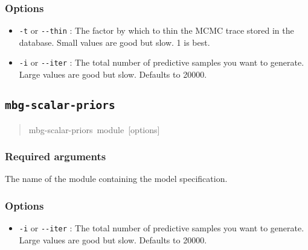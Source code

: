 


\subsubsection{Options}
\label{sec:id9}
\begin{itemize}
\item {} 
\texttt{-t} or \texttt{-{}-thin} : The factor by which to thin the MCMC trace stored in the database.
Small values are good but slow. 1 is best.

\item {} 
\texttt{-i} or \texttt{-{}-iter} : The total number of predictive samples you want to generate. Large
values are good but slow. Defaults to 20000.

\end{itemize}





\subsection{\texttt{mbg-scalar-priors}}
\label{sec:mbg-scalar-priors}
\begin{quote}{\ttfamily \raggedright \noindent
mbg-scalar-priors~module~{[}options{]}
}\end{quote}





\subsubsection{Required arguments}
\label{sec:id10}
\setcounter{listcnt0}{0}
\begin{list}{.}
{
\setlength{\rightmargin}{\leftmargin}
}
\item {} 
The name of the module containing the model specification.

\end{list}





\subsubsection{Options}
\label{sec:id11}
\begin{itemize}
\item {} 
\texttt{-i} or \texttt{-{}-iter} : The total number of predictive samples you want to generate. Large
values are good but slow. Defaults to 20000.

\end{itemize}


